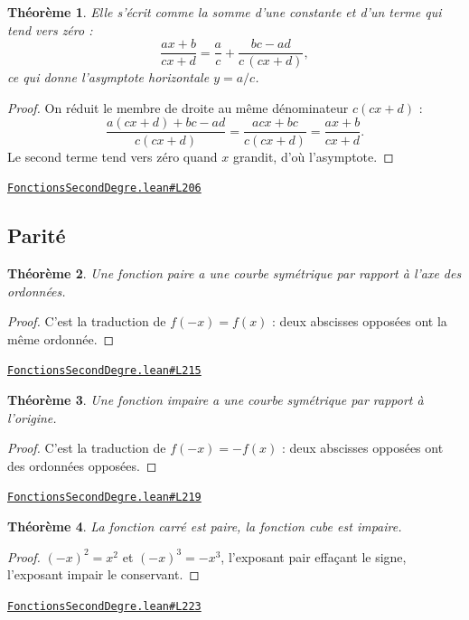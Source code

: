 \documentclass[11pt,a4paper]{article}
\theoremstyle{definition}
\theoremstyle{plain}
\newtheorem{theoreme}{Théorème}
\newcommand{\source}[2]{\par\smallskip\noindent\hfill{\footnotesize\href{#1}{\texttt{#2}}}\par\smallskip}
\begin{document}
\begin{theoreme}
Elle s'écrit comme la somme d'une constante et d'un terme qui tend vers zéro :
\[ \frac{ax+b}{cx+d} = \frac{a}{c} + \frac{bc - ad}{c\,(cx+d)} , \]
ce qui donne l'asymptote horizontale $y = a/c$.
\end{theoreme}

\begin{proof}
On réduit le membre de droite au même dénominateur $c(cx+d)$ :
\[ \frac{a(cx+d) + bc - ad}{c(cx+d)} = \frac{acx + bc}{c(cx+d)} = \frac{ax+b}{cx+d} . \]
Le second terme tend vers zéro quand $x$ grandit, d'où l'asymptote.
\end{proof}
\source{https://github.com/Commutator-IO/learn-lean/blob/main/cours/02-lycee/02-fonctions-second-degre/FonctionsSecondDegre.lean\#L206}{FonctionsSecondDegre.lean\#L206}

\subsection{Parité}

\begin{theoreme}
Une fonction paire a une courbe symétrique par rapport à l'axe des ordonnées.
\end{theoreme}

\begin{proof}
C'est la traduction de $f(-x) = f(x)$ : deux abscisses opposées ont la même
ordonnée.
\end{proof}
\source{https://github.com/Commutator-IO/learn-lean/blob/main/cours/02-lycee/02-fonctions-second-degre/FonctionsSecondDegre.lean\#L215}{FonctionsSecondDegre.lean\#L215}

\begin{theoreme}
Une fonction impaire a une courbe symétrique par rapport à l'origine.
\end{theoreme}

\begin{proof}
C'est la traduction de $f(-x) = -f(x)$ : deux abscisses opposées ont des ordonnées
opposées.
\end{proof}
\source{https://github.com/Commutator-IO/learn-lean/blob/main/cours/02-lycee/02-fonctions-second-degre/FonctionsSecondDegre.lean\#L219}{FonctionsSecondDegre.lean\#L219}

\begin{theoreme}
La fonction carré est paire, la fonction cube est impaire.
\end{theoreme}

\begin{proof}
$(-x)^2 = x^2$ et $(-x)^3 = -x^3$, l'exposant pair effaçant le signe, l'exposant impair
le conservant.
\end{proof}
\source{https://github.com/Commutator-IO/learn-lean/blob/main/cours/02-lycee/02-fonctions-second-degre/FonctionsSecondDegre.lean\#L223}{FonctionsSecondDegre.lean\#L223}
\end{document}
